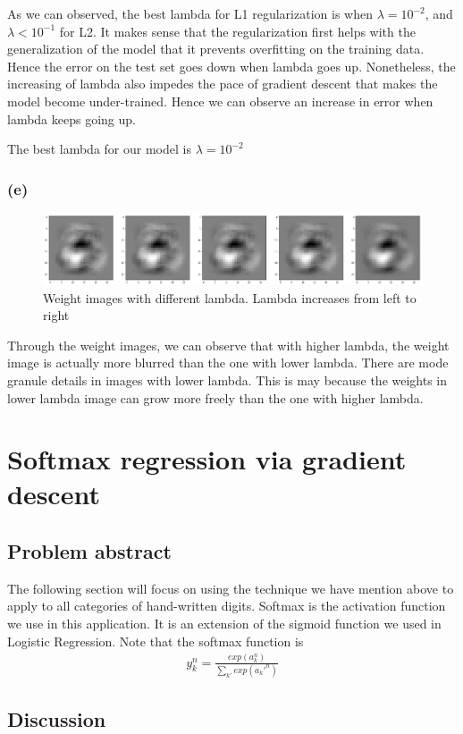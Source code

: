\documentclass{article}
\begin{document}
As we can observed, the best lambda for L1 regularization is when $\lambda = 10^{-2}$, and $\lambda < 10^{-1}$ for L2. It makes sense that the regularization first helps with the generalization of the model that it prevents overfitting on the training data. Hence the error on the test set goes down when lambda goes up. Nonetheless, the increasing of lambda also impedes the pace of gradient descent that makes the model become under-trained. Hence we can observe an increase in error when lambda keeps going up.

The best lambda for our model is $\lambda=10^{-2}$ 
\subsubsection*{(e)}
\begin{figure}[h]
	\centering
	\includegraphics[width=\textwidth]{pics/weight_img.png}
	\caption{Weight images with different lambda. Lambda increases from left to right}
\end{figure}
Through the weight images, we can observe that with higher lambda, the weight image is actually more blurred than the one with lower lambda. There are mode granule details in images with lower lambda. This is may because the weights in lower lambda image can grow more freely than the one with higher lambda.
\newpage
\section{Softmax regression via gradient descent}
\subsection{Problem abstract}
The following section will focus on using the technique we have mention above to apply to all categories of hand-written digits. Softmax is the activation function we use in this application. It is an extension of the sigmoid function we used in Logistic Regression. Note that the softmax function is \begin{align*}
y_k^n =\frac{exp(a_k^n)}{\sum_{k'} exp(a_k'^n )}
\end{align*}

\subsection{Discussion}
\end{document}
